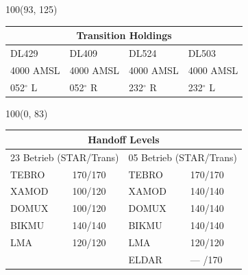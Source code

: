 \documentclass[10pt,landscape,a4paper]{article}
\begin{document}
\begin{textblock}{100}(93, 125)
\begin{table}[]
\begin{tabular}{llll} 
\multicolumn{4}{c}{\textbf{Transition Holdings}}                                                                                                                                        \\ \hline
\multicolumn{1}{|l|}{DL429} &
\multicolumn{1}{l|}{DL409} &
\multicolumn{1}{l|}{DL524} &
\multicolumn{1}{l|}{DL503} \\ \hline
\multicolumn{1}{|l|}{4000 AMSL} & 
\multicolumn{1}{l|}{4000 AMSL} & 
\multicolumn{1}{l|}{4000 AMSL} & 
\multicolumn{1}{l|}{4000 AMSL} \\
\multicolumn{1}{|l|}{052$^\circ$ L} &
\multicolumn{1}{l|}{052$^\circ$ R} &
\multicolumn{1}{l|}{232$^\circ$ R} &
\multicolumn{1}{l|}{232$^\circ$ L}   \\ \hline
\end{tabular}
\end{table}
\end{textblock}


\begin{textblock}{100}(0, 83)
\begin{table}[]
\begin{tabular}{llll}
\multicolumn{4}{c}{\textbf{Handoff Levels}} \\ \hline
\multicolumn{2}{|l|}{23 Betrieb (STAR/Trans)} & \multicolumn{2}{l|}{05 Betrieb (STAR/Trans)}\\ \hline
\multicolumn{1}{|l}{TEBRO} & \multicolumn{1}{l|}{170/170} & \multicolumn{1}{l}{TEBRO} & \multicolumn{1}{l|}{170/170} \\ 
\multicolumn{1}{|l}{XAMOD} & \multicolumn{1}{l|}{100/120} & \multicolumn{1}{l}{XAMOD} & \multicolumn{1}{l|}{140/140} \\ 
\multicolumn{1}{|l}{DOMUX} & \multicolumn{1}{l|}{100/120} & \multicolumn{1}{l}{DOMUX} & \multicolumn{1}{l|}{140/140} \\ 
\multicolumn{1}{|l}{BIKMU} & \multicolumn{1}{l|}{140/140} & \multicolumn{1}{l}{BIKMU} & \multicolumn{1}{l|}{140/140} \\ 
\multicolumn{1}{|l}{LMA} & \multicolumn{1}{l|}{120/120} &\multicolumn{1}{l}{LMA} & \multicolumn{1}{l|}{120/120} \\
\multicolumn{1}{|l}{} & \multicolumn{1}{l|}{} & \multicolumn{1}{l}{ELDAR} & \multicolumn{1}{l|}{--- /170} \\ \hline
\end{tabular}
\end{table}
\end{textblock}
\end{document}
